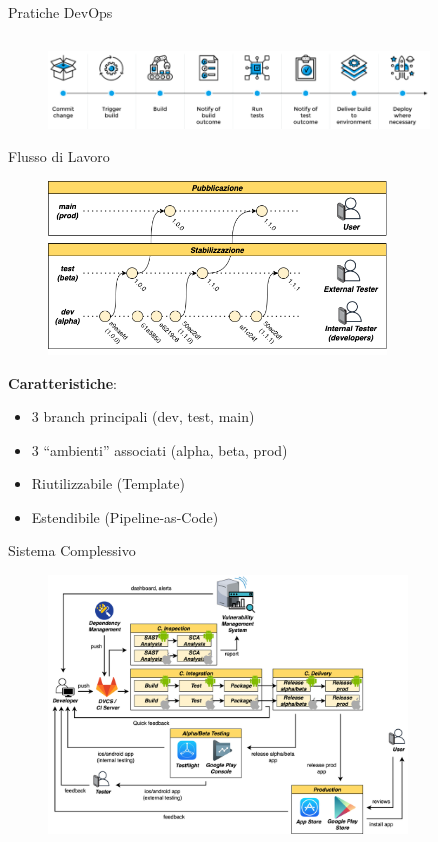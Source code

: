 \begin{frame}{Pratiche DevOps}
\begin{columns}[onlytextwidth,t]
\begin{column}{0.45\textwidth}
        \end{column}
    \end{columns}

    \vspace{2mm}

    \begin{figure}[H]
        \includegraphics[width=0.9\textwidth]{img/cicd.png}
    \end{figure}

\end{frame}

\begin{frame}{Flusso di Lavoro}
    \begin{figure}[H]
        \includegraphics[width=0.8\textwidth]{img/release-flow.png}
    \end{figure}

    \textbf{Caratteristiche}:
    \begin{itemize}
        \item 3 branch principali (dev, test, main)
        \item 3 ``ambienti'' associati (alpha, beta, prod)
        \item Riutilizzabile (Template)
        \item Estendibile (Pipeline-as-Code)
    \end{itemize}
\end{frame}

\begin{frame}{Sistema Complessivo}

    \begin{figure}[H]
        \includegraphics[width=0.85\textwidth]{img/full-cicd.png}
    \end{figure}

\end{frame}